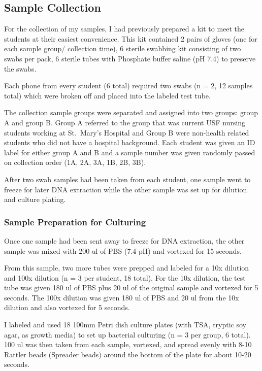 \documentclass[]{article}
\begin{document}
\hypertarget{sample-collection}{%
\subsection{Sample Collection}\label{sample-collection}}

For the collection of my samples, I had previously prepared a kit to
meet the students at their easiest convenience. This kit contained 2
pairs of gloves (one for each sample group/ collection time), 6 sterile
swabbing kit consisting of two swabs per pack, 6 sterile tubes with
Phosphate buffer saline (pH 7.4) to preserve the swabs.

Each phone from every student (6 total) required two swabs (n = 2, 12
samples total) which were broken off and placed into the labeled test
tube.

The collection sample groups were separated and assigned into two
groups: group A and group B. Group A referred to the group that was
current USF nursing students working at St.~Mary's Hospital and Group B
were non-health related students who did not have a hospital background.
Each student was given an ID label for either group A and B and a sample
number was given randomly passed on collection order (1A, 2A, 3A, 1B,
2B, 3B).

After two swab samples had been taken from each student, one sample went
to freeze for later DNA extraction while the other sample was set up for
dilution and culture plating.

\hypertarget{sample-preparation-for-culturing}{%
\subsubsection{Sample Preparation for
Culturing}\label{sample-preparation-for-culturing}}

Once one sample had been sent away to freeze for DNA extraction, the
other sample was mixed with 200 ul of PBS (7.4 pH) and vortexed for 15
seconds.

From this sample, two more tubes were prepped and labeled for a 10x
dilution and 100x dilution (n = 3 per student, 18 total). For the 10x
dilution, the test tube was given 180 ul of PBS plus 20 ul of the
original sample and vortexed for 5 seconds. The 100x dilution was given
180 ul of PBS and 20 ul from the 10x dilution and also vortexed for 5
seconds.

I labeled and used 18 100mm Petri dish culture plates (with TSA, tryptic
soy agar, as growth media) to set up bacterial culturing (n = 3 per
group, 6 total). 100 ul was then taken from each sample, vortexed, and
spread evenly with 8-10 Rattler beads (Spreader beads) around the bottom
of the plate for about 10-20 seconds.
\end{document}
